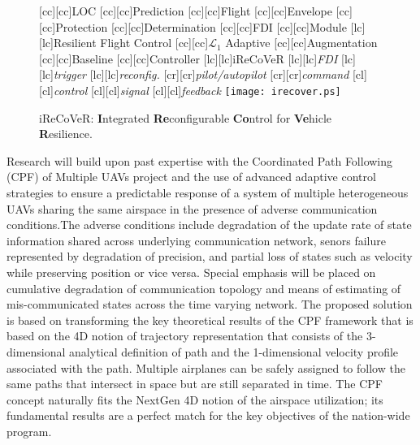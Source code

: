 \documentclass[letter,onecolumn,12pt]{aiaa-tc}
\newcommand{\Lone}{\mathcal{L}_1}
\begin{document}
\begin{figure}
\centering

[cc][cc]{{\sf LOC}}
[cc][cc]{{\sf Prediction}}
%
[cc][cc]{{\sf Flight}}
[cc][cc]{{\sf Envelope}}
[cc][cc]{{\sf Protection}}
[cc][cc]{{\sf Determination}}
%
[cc][cc]{{\sf FDI}}
[cc][cc]{{\sf Module}}
%
[lc][lc]{{\sf Resilient Flight Control}}
[cc][cc]{{\sf $\Lone$ Adaptive}}
[cc][cc]{{\sf Augmentation}}
[cc][cc]{{\sf Baseline}}
[cc][cc]{{\sf Controller}}
%
[lc][lc]{{\sf iReCoVeR}}
%
[lc][lc]{{\sf \it FDI}}
[lc][lc]{{\sf \it trigger}}
%
[lc][lc]{{\sf \it reconfig.}}
%
[cr][cr]{{\sf \it pilot/autopilot}}
[cr][cr]{{\sf \it command}}
[cl][cl]{{\sf \it control}}
[cl][cl]{{\sf \it signal}}
[cl][cl]{{\sf \it feedback}}
%
\vspace{-4mm}
\texttt{[image: irecover.ps]}
\caption*{\footnotesize iReCoVeR: \textbf{I}ntegrated \textbf{Re}configurable \textbf{Co}ntrol for \textbf{Ve}hicle \textbf{R}esilience.}
\label{fig:IReCoVeR}
\end{figure}

\vspace{-1mm}
Research will build upon past expertise with the Coordinated Path Following (CPF) of Multiple UAVs project and the use of advanced adaptive control strategies to ensure a predictable response of a system of multiple heterogeneous UAVs sharing the same airspace in the presence of adverse communication conditions.The adverse conditions include degradation of the update rate of state information shared across underlying communication network, senors failure represented by degradation of precision, and partial loss of states such as velocity while preserving position or vice versa. Special emphasis will be placed on cumulative degradation of communication topology and means of estimating of mis-communicated states across the time varying network. The proposed solution is based on transforming the key theoretical results of the CPF framework that is based on the 4D notion of trajectory representation that consists of the 3-dimensional analytical definition of path and the 1-dimensional velocity profile associated with the path. Multiple airplanes can be safely assigned to follow the same paths that intersect in space but are still separated in time. The CPF concept naturally fits the NextGen 4D notion of the airspace utilization; its fundamental results are a perfect match for the key objectives of the nation-wide program.
\end{document}
